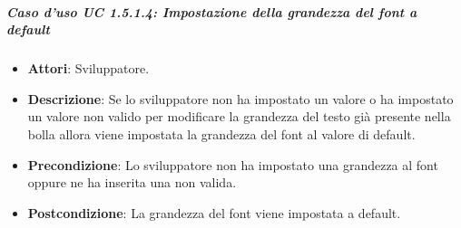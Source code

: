 \subparagraph{Caso d'uso UC 1.5.1.4: Impostazione della grandezza del font a default}

\FloatBarrier
\begin{itemize}
\item\textbf{Attori}: Sviluppatore.
\item\textbf{Descrizione}: Se lo sviluppatore non ha impostato un valore o ha impostato un valore non valido per modificare la grandezza del testo già presente nella bolla allora viene impostata la grandezza del font al valore di default.
\item\textbf{Precondizione}: Lo sviluppatore non ha impostato una grandezza al font oppure ne ha inserita una non valida.
\item\textbf{Postcondizione}: La grandezza del font viene impostata a default.

\end{itemize}

